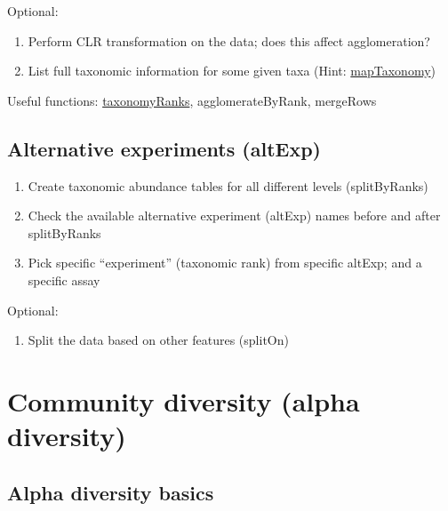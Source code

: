 \documentclass[
]{book}
\providecommand{\tightlist}{%
  \setlength{\itemsep}{0pt}\setlength{\parskip}{0pt}}
\begin{document}
Optional:

\begin{enumerate}
\def\labelenumi{\arabic{enumi}.}
\setcounter{enumi}{3}
\tightlist
\item
  Perform CLR transformation on the data; does this affect agglomeration?
\item
  List full taxonomic information for some given taxa (Hint: \href{https://microbiome.github.io/mia/reference/taxonomy-methods.html}{mapTaxonomy})
\end{enumerate}

Useful functions: \href{https://microbiome.github.io/mia/reference/taxonomy-methods.html}{taxonomyRanks}, agglomerateByRank, mergeRows

\hypertarget{alternative-experiments-altexp}{%
\subsection{Alternative experiments (altExp)}\label{alternative-experiments-altexp}}

\begin{enumerate}
\def\labelenumi{\arabic{enumi}.}
\tightlist
\item
  Create taxonomic abundance tables for all different levels (splitByRanks)
\item
  Check the available alternative experiment (altExp) names before and after splitByRanks
\item
  Pick specific ``experiment'' (taxonomic rank) from specific altExp; and a specific assay
\end{enumerate}

Optional:

\begin{enumerate}
\def\labelenumi{\arabic{enumi}.}
\setcounter{enumi}{3}
\tightlist
\item
  Split the data based on other features (splitOn)
\end{enumerate}

\hypertarget{community-diversity-alpha-diversity}{%
\section{Community diversity (alpha diversity)}\label{community-diversity-alpha-diversity}}

\hypertarget{alpha-diversity-basics}{%
\subsection{Alpha diversity basics}\label{alpha-diversity-basics}}
\end{document}
